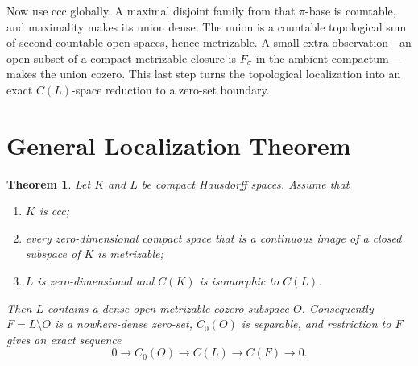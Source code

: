 \documentclass[11pt]{article}
\newtheorem{theorem}{Theorem}
\begin{document}
Now use ccc globally.  A maximal disjoint family from that $\pi$-base is
countable, and maximality makes its union dense.  The union is a countable
topological sum of second-countable open spaces, hence metrizable.  A small
extra observation---an open subset of a compact metrizable closure is
$F_\sigma$ in the ambient compactum---makes the union cozero.  This last
step turns the topological localization into an exact $C(L)$-space
reduction to a zero-set boundary.

\section*{General Localization Theorem}

\begin{theorem}\label{thm:localization}
Let $K$ and $L$ be compact Hausdorff spaces.  Assume that
\begin{enumerate}
\item $K$ is ccc;
\item every zero-dimensional compact space that is a continuous image of a
closed subspace of $K$ is metrizable;
\item $L$ is zero-dimensional and $C(K)$ is isomorphic to $C(L)$.
\end{enumerate}
Then $L$ contains a dense open metrizable cozero subspace $O$.
Consequently $F=L\setminus O$ is a nowhere-dense zero-set,
$C_0(O)$ is separable, and restriction to $F$ gives an exact sequence
\[
0\longrightarrow C_0(O)\longrightarrow C(L)
 \longrightarrow C(F)\longrightarrow 0.
\]
\end{theorem}
\end{document}
